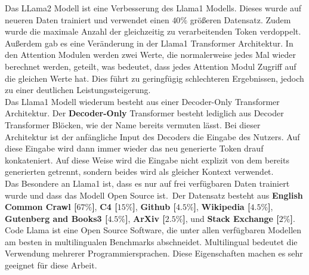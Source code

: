 \documentclass[12pt,letterpaper,ngerman]{article}
\begin{document}
Das LLama2 Modell ist eine Verbesserung des Llama1 Modells.
Dieses wurde auf neueren Daten trainiert und verwendet einen 
$40 \%$ größeren Datensatz. Zudem wurde die maximale Anzahl 
der gleichzeitig zu verarbeitenden Token verdoppelt. Außerdem 
gab es eine Veränderung in der Llama1 Transformer Architektur. 
In den Attention Modulen werden zwei Werte, die normalerweise 
jedes Mal wieder berechnet werden, geteilt, was bedeutet, dass 
jedes Attention Modul Zugriff auf die gleichen Werte hat.
Dies führt zu geringfügig schlechteren Ergebnissen, jedoch zu
einer deutlichen Leistungssteigerung.\\

Das Llama1 Modell wiederum besteht aus einer Decoder-Only
Transformer Architektur. Der {\bf Decoder-Only} Transformer
besteht lediglich aus Decoder Transformer Blöcken,
wie der Name bereits vermuten lässt. Bei dieser Architektur
ist der anfängliche Input des Decoders die Eingabe des Nutzers.
Auf diese Eingabe wird dann immer wieder das neu generierte Token
drauf konkateniert. Auf diese Weise wird die Eingabe nicht explizit
von dem bereits generierten getrennt, sondern beides wird als 
gleicher Kontext verwendet.\\

Das Besondere an Llama1 ist, dass es nur auf frei verfügbaren
Daten trainiert wurde und dass das Modell Open Source ist. Der
Datensatz besteht aus {\bf English Common Crawl [$67\%$]},
{\bf C4 [$15\%$]}, {\bf Github [$4.5\%$]},
{\bf Wikipedia [$4.5\%$]}, {\bf Gutenberg and Books3 [$4.5\%$]}, 
{\bf ArXiv [$2.5\%$]}, und {\bf Stack Exchange [$2\%$]}.\\

Code Llama ist eine Open Source Software, die unter allen 
verfügbaren Modellen am besten in multilingualen Benchmarks 
abschneidet. Multilingual bedeutet die Verwendung mehrerer 
Programmiersprachen. Diese Eigenschaften machen es sehr geeignet
für diese Arbeit.
\end{document}
